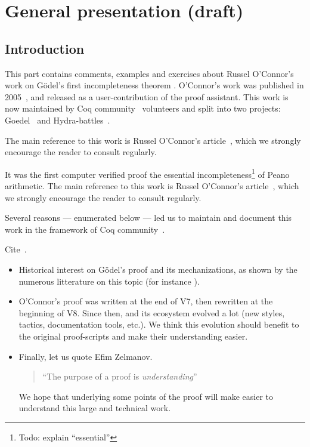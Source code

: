 \chapter{General presentation (draft)}

\section{Introduction}
This part contains comments, examples  and exercises about Russel O'Connor's work on G\"{o}del's first incompleteness theorem  \cite{Godel1986-GDECW}.
O'Connor's work was published in 2005~\cite{OConnor05}, and released as a user-contribution of the \coq proof assistant.
This work is now maintained by Coq community~\cite{CoqCommunity} volunteers and split into two projects: Goedel~\cite{Goedel} and Hydra-battles~\cite{HydraBattles}.

The main reference to this work is  Russel O'Connor's article~\cite{OConnor05}, which we strongly encourage the reader to 
consult regularly. 

It was the first computer verified proof 
the essential incompleteness\footnote{Todo: explain ``essential''} of Peano arithmetic.
The main reference to this work is  Russel O'Connor's article~\cite{OConnor05}, which we strongly encourage the reader to 
consult regularly. 

Several reasons --- enumerated below --- led us to maintain and document this work in the framework of 
Coq community~\cite{CoqCommunity}.

\begin{todo}
  Cite~\cite{Dowek2023}.
\end{todo}

 \begin{itemize}
 \item Historical interest on G\"{o}del's proof and its mechanizations, as shown by the numerous litterature on this topic
   (for instance \cite{smullyan1992godel, Hofstadter1999Godel, GoedelCassou}).
 
   
  \item O'Connor's proof was written at the end of \coq V7, then rewritten at the beginning of \coq V8. Since then, \coq and its ecosystem evolved a lot (new styles, tactics, documentation tools, etc.).
          We think this evolution should benefit
          to the original proof-scripts and make their understanding easier.

        \item Finally, let us quote  Efim Zelmanov.
             \begin{quote}
      ``The purpose of a proof is \emph{understanding}'' ~\cite{mathproof}
       
    \end{quote}
    We hope that underlying some points of the proof will
     make easier to understand this large and technical work.

        \end{itemize}


